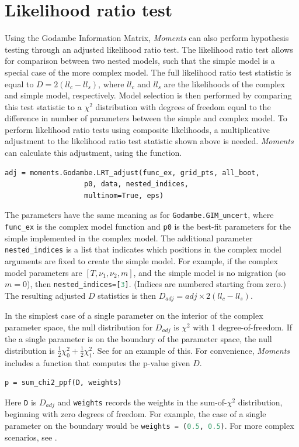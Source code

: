 \documentclass[12pt]{article}
\makeatletter
\newcommand{\py}[1]{\lstinline[breaklines=true,language=Python, showstringspaces=False]@#1@}
\makeatother
\begin{document}
\section{Likelihood ratio test}
Using the Godambe Information Matrix, \textit{Moments} can also perform hypothesis testing through an adjusted likelihood ratio test.
The likelihood ratio test allows for comparison between two nested models, such that the simple model is a special case of the more complex model.
The full likelihood ratio test statistic is equal to $D = 2(ll_{c}-ll_{s})$, where $ll_{c}$ and $ll_{s}$ are the likelihoods of the complex and simple model, respectively.
Model selection is then performed by comparing this test statistic to a $\chi^2$ distribution with degrees of freedom equal to the difference in number of parameters between the simple and complex model.
To perform likelihood ratio tests using composite likelihoods, a multiplicative adjustment to the likelihood ratio test statistic shown above is needed.
\textit{Moments} can calculate this adjustment, using the function.
\begin{lstlisting}
adj = moments.Godambe.LRT_adjust(func_ex, grid_pts, all_boot,
			 	   p0, data, nested_indices, 
				   multinom=True, eps)
\end{lstlisting}
The parameters have the same meaning as for \py{Godambe.GIM_uncert}, where \py{func_ex} is the complex model function and \py{p0} is the best-fit parameters for the simple implemented in the complex model.
The additional parameter \py{nested_indices} is a list that indicates which positions in the complex model arguments are fixed to create the simple model.
For example, if the complex model parameters are $[T, \nu_1, \nu_2, m]$, and the simple model is no migration (so $m = 0$), then \py{nested_indices=[3]}.
(Indices are numbered starting from zero.)
The resulting adjusted $D$ statistics is then $D_{adj} = adj \times 2(ll_{c}-ll_{s})$.

In the simplest case of a single parameter on the interior of the complex parameter space, the null distribution for $D_{adj}$ is $\chi^2$ with 1 degree-of-freedom.
If the a single parameter is on the boundary of the parameter space, the null distribution is $\frac{1}{2}\chi^2_0 + \frac{1}{2}\chi^2_1$.
See \cite{Coffman2015} for an example of this.
For convenience, \textit{Moments} includes a function that computes the p-value given $D$.
\begin{lstlisting}
p = sum_chi2_ppf(D, weights)
\end{lstlisting}
Here \py{D} is $D_{adj}$ and \py{weights} records the weights in the sum-of-$\chi^2$ distribution, beginning with zero degrees of freedom.
For example, the case of a single parameter on the boundary would be \py{weights = (0.5, 0.5)}.
For more complex scenarios, see \cite{Self1987}.
\end{document}
